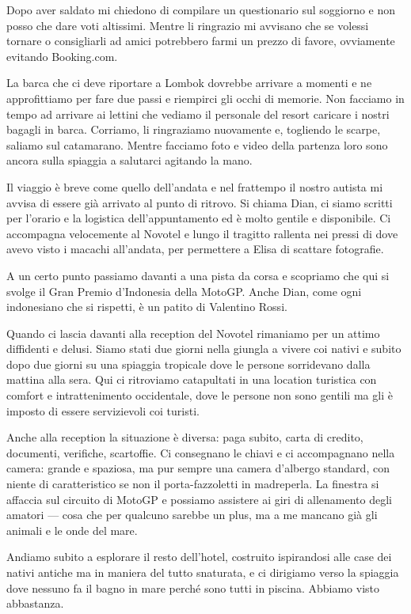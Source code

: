 Dopo aver saldato mi chiedono di compilare un questionario sul soggiorno e non posso che dare voti altissimi. Mentre li ringrazio mi avvisano che se volessi tornare o consigliarli ad amici potrebbero farmi un prezzo di favore, ovviamente evitando Booking.com.

La barca che ci deve riportare a Lombok dovrebbe arrivare a momenti e ne approfittiamo per fare due passi e riempirci gli occhi di memorie. Non facciamo in tempo ad arrivare ai lettini che vediamo il personale del resort caricare i nostri bagagli in barca. Corriamo, li ringraziamo nuovamente e, togliendo le scarpe, saliamo sul catamarano. Mentre facciamo foto e video della partenza loro sono ancora sulla spiaggia a salutarci agitando la mano.

Il viaggio è breve come quello dell'andata e nel frattempo il nostro autista mi avvisa di essere già arrivato al punto di ritrovo. Si chiama Dian, ci siamo scritti per l'orario e la logistica dell'appuntamento ed è molto gentile e disponibile. Ci accompagna velocemente al Novotel e lungo il tragitto rallenta nei pressi di dove avevo visto i macachi all'andata, per permettere a Elisa di scattare fotografie.

A un certo punto passiamo davanti a una pista da corsa e scopriamo che qui si svolge il Gran Premio d'Indonesia della MotoGP. Anche Dian, come ogni indonesiano che si rispetti, è un patito di Valentino Rossi.

Quando ci lascia davanti alla reception del Novotel rimaniamo per un attimo diffidenti e delusi. Siamo stati due giorni nella giungla a vivere coi nativi e subito dopo due giorni su una spiaggia tropicale dove le persone sorridevano dalla mattina alla sera. Qui ci ritroviamo catapultati in una location turistica con comfort e intrattenimento occidentale, dove le persone non sono gentili ma gli è imposto di essere servizievoli coi turisti.

Anche alla reception la situazione è diversa: paga subito, carta di credito, documenti, verifiche, scartoffie. Ci consegnano le chiavi e ci accompagnano nella camera: grande e spaziosa, ma pur sempre una camera d'albergo standard, con niente di caratteristico se non il porta-fazzoletti in madreperla. La finestra si affaccia sul circuito di MotoGP e possiamo assistere ai giri di allenamento degli amatori — cosa che per qualcuno sarebbe un plus, ma a me mancano già gli animali e le onde del mare.

Andiamo subito a esplorare il resto dell'hotel, costruito ispirandosi alle case dei nativi antiche ma in maniera del tutto snaturata, e ci dirigiamo verso la spiaggia dove nessuno fa il bagno in mare perché sono tutti in piscina. Abbiamo visto abbastanza.

